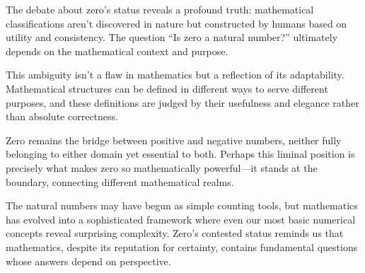 \documentclass[../../../OAE-SPEC-MAIN.tex]{subfiles}
\begin{document}
The debate about zero's status reveals a profound truth: mathematical classifications aren't discovered in nature but constructed by humans based on utility and consistency. The question ``Is zero a natural number?'' ultimately depends on the mathematical context and purpose.

This ambiguity isn't a flaw in mathematics but a reflection of its adaptability. Mathematical structures can be defined in different ways to serve different purposes, and these definitions are judged by their usefulness and elegance rather than absolute correctness.

Zero remains the bridge between positive and negative numbers, neither fully belonging to either domain yet essential to both. Perhaps this liminal position is precisely what makes zero so mathematically powerful---it stands at the boundary, connecting different mathematical realms.

The natural numbers may have begun as simple counting tools, but mathematics has evolved into a sophisticated framework where even our most basic numerical concepts reveal surprising complexity. Zero's contested status reminds us that mathematics, despite its reputation for certainty, contains fundamental questions whose answers depend on perspective.
\end{document}
